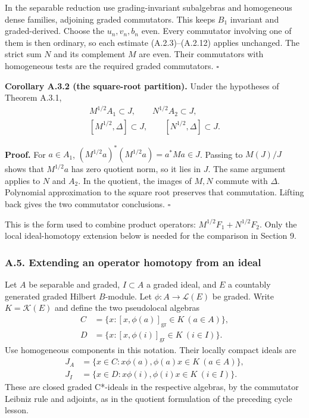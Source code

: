 \documentclass[
  11pt,
]{article}
\begin{document}
In the separable reduction use grading-invariant subalgebras and
homogeneous dense families, adjoining graded commutators. This keeps
\(B_1\) invariant and graded-derived. Choose the \(u_n,v_n,b_n\) even.
Every commutator involving one of them is then ordinary, so each
estimate (A.2.3)--(A.2.12) applies unchanged. The strict sum \(N\) and
its complement \(M\) are even. Their commutators with homogeneous tests
are the required graded commutators. \(\square\)

\textbf{Corollary A.3.2 (the square-root partition).} Under the
hypotheses of Theorem A.3.1, \[
\begin{gathered}
M^{1/2}A_1\subset J,\qquad N^{1/2}A_2\subset J,\\
[M^{1/2},\Delta]\subset J,\qquad
[N^{1/2},\Delta]\subset J.
\end{gathered}
\tag{A.3.1}
\]

\textbf{Proof.} For \(a\in A_1\), \((M^{1/2}a)^*(M^{1/2}a)=a^*Ma\in J\).
Passing to \(M(J)/J\) shows that \(M^{1/2}a\) has zero quotient norm, so
it lies in \(J\). The same argument applies to \(N\) and \(A_2\). In the
quotient, the images of \(M,N\) commute with \(\Delta\). Polynomial
approximation to the square root preserves that commutation. Lifting
back gives the two commutator conclusions. \(\square\)

This is the form used to combine product operators:
\(M^{1/2}F_1+N^{1/2}F_2\). Only the local ideal-homotopy extension below
is needed for the comparison in Section 9.

\subsubsection{A.5. Extending an operator homotopy from an
ideal}\label{a.5.-extending-an-operator-homotopy-from-an-ideal}

Let \(A\) be separable and graded, \(I\subset A\) a graded ideal, and
\(E\) a countably generated graded Hilbert \(B\)-module. Let
\(\phi:A\to\mathcal L(E)\) be graded. Write \(K=\mathcal K(E)\) and
define the two pseudolocal algebras \[
\begin{aligned}
C&=\{x:[x,\phi(a)]_{\mathrm{gr}}\in K\ (a\in A)\},\\
D&=\{x:[x,\phi(i)]_{\mathrm{gr}}\in K\ (i\in I)\}.
\end{aligned}
\tag{A.5.1}
\] Use homogeneous components in this notation. Their locally compact
ideals are \[
\begin{aligned}
J_A&=\{x\in C:x\phi(a),\phi(a)x\in K\ (a\in A)\},\\
J_I&=\{x\in D:x\phi(i),\phi(i)x\in K\ (i\in I)\}.
\end{aligned}
\tag{A.5.2}
\] These are closed graded C*-ideals in the respective algebras, by the
commutator Leibniz rule and adjoints, as in the quotient formulation of
the preceding cycle lesson.
\end{document}
